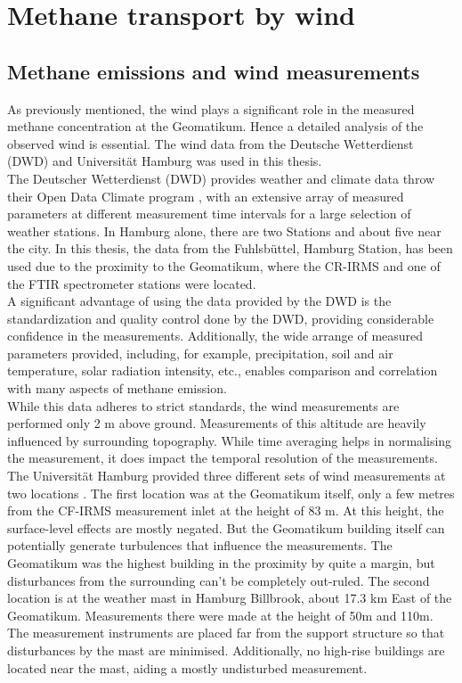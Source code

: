 \section{Methane transport by wind}
\subsection{Methane emissions and wind measurements}
As previously mentioned, the wind plays a significant role in the measured methane concentration at the Geomatikum. Hence a detailed analysis of the observed wind is essential. The wind data from the Deutsche Wetterdienst (DWD) and Universität Hamburg was used in this thesis. \\
The Deutscher Wetterdienst (DWD) provides weather and climate data throw their Open Data Climate program \cite{DeutschenWetterdienst.20230501}, with an extensive array of measured parameters at different measurement time intervals for a large selection of weather stations. In Hamburg alone, there are two Stations and about five near the city. In this thesis, the data from the Fuhlsbüttel, Hamburg Station, has been used due to the proximity to the Geomatikum, where the CR-IRMS and one of the FTIR spectrometer stations were located. \\
A significant advantage of using the data provided by the DWD is the standardization and quality control done by the DWD, providing considerable confidence in the measurements. Additionally, the wide arrange of measured parameters provided, including, for example, precipitation, soil and air temperature, solar radiation intensity, etc., enables comparison and correlation with many aspects of methane emission.\\
While this data adheres to strict standards, the wind measurements are performed only 2 m above ground. Measurements of this altitude are heavily influenced by surrounding topography. While time averaging helps in normalising the measurement, it does impact the temporal resolution of the measurements.\\
The Universität Hamburg provided three different sets of wind measurements at two locations \cite{Lange.20220501}. The first location was at the Geomatikum itself, only a few metres from the CF-IRMS measurement inlet at the height of 83 m. At this height, the surface-level effects are mostly negated. But the Geomatikum building itself can potentially generate turbulences that influence the measurements. The Geomatikum was the highest building in the proximity by quite a margin, but disturbances from the surrounding can’t be completely out-ruled. The second location is at the weather mast in Hamburg Billbrook, about 17.3 km East of the Geomatikum. Measurements there were made at the height of 50m and 110m. The measurement instruments are placed far from the support structure so that disturbances by the mast are minimised. Additionally, no high-rise buildings are located near the mast, aiding a mostly undisturbed measurement.\\
